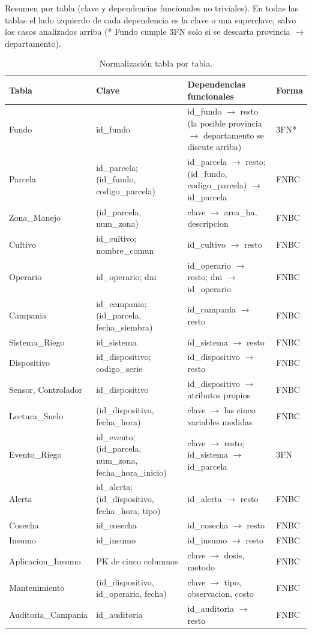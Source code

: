 \documentclass[11pt,letterpaper]{article}
\begin{document}
Resumen por tabla (clave y dependencias funcionales no triviales). En todas las tablas el lado izquierdo de cada dependencia es la clave o una superclave, salvo los casos analizados arriba (* Fundo cumple 3FN solo si se descarta provincia $\to$ departamento).

\begin{table}[H]
\centering\footnotesize
\begin{tabularx}{\textwidth}{>{\raggedright\arraybackslash}p{3.2cm}>{\raggedright\arraybackslash}p{3.6cm}>{\raggedright\arraybackslash}X>{\centering\arraybackslash}p{1.2cm}}
\toprule
\textbf{Tabla} & \textbf{Clave} & \textbf{Dependencias funcionales} & \textbf{Forma} \\
\midrule
Fundo & id\_fundo & id\_fundo $\to$ resto (la posible provincia $\to$ departamento se discute arriba) & 3FN* \\
Parcela & id\_parcela; (id\_fundo, codigo\_parcela) & id\_parcela $\to$ resto; (id\_fundo, codigo\_parcela) $\to$ id\_parcela & FNBC \\
Zona\_Manejo & (id\_parcela, num\_zona) & clave $\to$ area\_ha, descripcion & FNBC \\
Cultivo & id\_cultivo; nombre\_comun & id\_cultivo $\to$ resto & FNBC \\
Operario & id\_operario; dni & id\_operario $\to$ resto; dni $\to$ id\_operario & FNBC \\
Campania & id\_campania; (id\_parcela, fecha\_siembra) & id\_campania $\to$ resto & FNBC \\
Sistema\_Riego & id\_sistema & id\_sistema $\to$ resto & FNBC \\
Dispositivo & id\_dispositivo; codigo\_serie & id\_dispositivo $\to$ resto & FNBC \\
Sensor, Controlador & id\_dispositivo & id\_dispositivo $\to$ atributos propios & FNBC \\
Lectura\_Suelo & (id\_dispositivo, fecha\_hora) & clave $\to$ las cinco variables medidas & FNBC \\
Evento\_Riego & id\_evento; (id\_parcela, num\_zona, fecha\_hora\_inicio) & clave $\to$ resto; id\_sistema $\to$ id\_parcela & 3FN \\
Alerta & id\_alerta; (id\_dispositivo, fecha\_hora, tipo) & id\_alerta $\to$ resto & FNBC \\
Cosecha & id\_cosecha & id\_cosecha $\to$ resto & FNBC \\
Insumo & id\_insumo & id\_insumo $\to$ resto & FNBC \\
Aplicacion\_Insumo & PK de cinco columnas & clave $\to$ dosis, metodo & FNBC \\
Mantenimiento & (id\_dispositivo, id\_operario, fecha) & clave $\to$ tipo, observacion, costo & FNBC \\
Auditoria\_Campania & id\_auditoria & id\_auditoria $\to$ resto & FNBC \\
\bottomrule
\end{tabularx}
\caption{Normalización tabla por tabla.}
\end{table}
\end{document}
